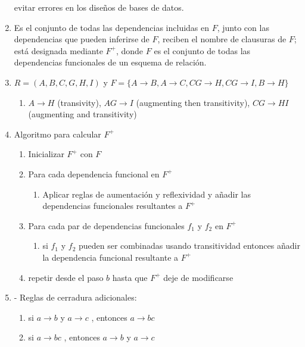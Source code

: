 \documentclass[twoside]{article}
\begin{document}
\begin{enumerate}
            evitar errores en los diseños de bases de datos.
      \item Es el conjunto de todas las dependencias incluidas en $F$, junto con las dependencias que pueden inferirse de $F$, reciben el nombre
            de clausuras de $F$; está designada mediante $F^+$, donde $F$ es el conjunto de todas las dependencias funcionales de un esquema de relación.
      \item $R = (A, B, C, G, H, I)$ y $F = \{ A \rightarrow B, A \rightarrow C, CG \rightarrow H, CG \rightarrow I, B \rightarrow H \}$
            \begin{enumerate}
                  \item $A \rightarrow H$ (transivity), $AG \rightarrow I$ (augmenting then transitivity), $CG \rightarrow HI$ (augmenting and transitivity)
            \end{enumerate}
      \item Algoritmo para calcular $F^+$
            \begin{enumerate}
                  \item Inicializar $F^+$ con $F$
                  \item Para cada dependencia funcional en $F^+$
                        \begin{enumerate}
                              \item Aplicar reglas de aumentación y reflexividad y añadir las dependencias funcionales resultantes a $F^+$
                        \end{enumerate}
                  \item Para cada par de dependencias funcionales $f_1$ y $f_2$ en $F^+$
                        \begin{enumerate}
                              \item si $f_1$ y $f_2$ pueden ser combinadas usando transitividad entonces añadir la dependencia funcional resultante a $F^+$
                        \end{enumerate}
                  \item repetir desde el paso $b$ hasta que $F^+$ deje de modificarse
            \end{enumerate}
      \item - Reglas de cerradura adicionales:
            \begin{enumerate}
                  \item si $a \rightarrow b$ y $a \rightarrow c$ , entonces $a \rightarrow bc$
                  \item si $a \rightarrow bc$ , entonces $a \rightarrow b$ y $a \rightarrow c$

\end{enumerate}
\end{enumerate}
\end{document}
